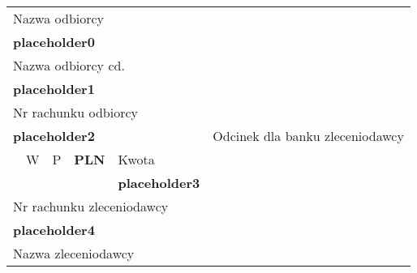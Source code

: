 \documentclass{article}
\begin{document}
\thispagestyle{empty}
\begin{table}[t]
{\setlength{\tabcolsep}{0.5em}
\begin{tabularx}{\textwidth}{|Xccll|c|}
\hline
\multicolumn{5}{|l|}{Nazwa odbiorcy}                                                                                    & \multirow{22}{*}{ \begin{sideways}Odcinek dla banku zleceniodawcy\end{sideways}} \\
\multicolumn{5}{|l|}{\textbf{placeholder0}}                                                                                                  &                                             \\
\multicolumn{5}{|l|}{Nazwa odbiorcy cd.}                                                                                &                                             \\
\multicolumn{5}{|l|}{\textbf{placeholder1}}                                                                                                  &                                             \\ \cline{1-5}
\multicolumn{5}{|l|}{Nr rachunku odbiorcy}                                                                              &                                             \\
\multicolumn{5}{|l|}{\textbf{placeholder2}}                                                                                                  &                                             \\ \cline{2-3} \cline{5-5}
 & \multicolumn{1}{|l|}{W}      & \multicolumn{1}{l|}{P}      & \multicolumn{1}{X|}{\centering \textbf{PLN}}      & Kwota                    &                                             \\ \cline{2-3}
&                             &                             & \multicolumn{1}{l|}{}                  &  \textbf{placeholder3}                &                                             \\ \cline{1-5}
\multicolumn{5}{|l|}{Nr rachunku zleceniodawcy}                                                                         &                                             \\
\multicolumn{5}{|l|}{\textbf{placeholder4}}                                                                                                  &                                             \\
\multicolumn{5}{|l|}{Nazwa zleceniodawcy}                                                                               &                                             \\

\end{tabularx}}
\end{table}
\end{document}
